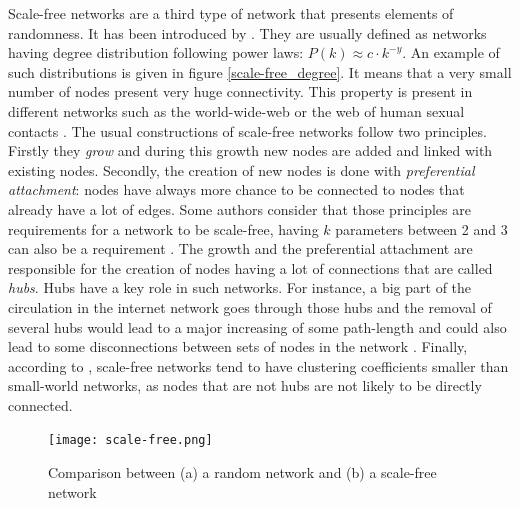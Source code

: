\documentclass[a4paper, 12pt]{report}
\begin{document}
Scale-free networks are a third type of network that presents elements of randomness. It has been introduced by \cite{scale-free}. They are usually defined as networks having degree distribution following power laws: $ P(k) \approx c \cdot k^{-y}$. An example of such distributions is given in figure \ref{scale-free_degree}. It means that a very small number of nodes present very huge connectivity. This property is present in different networks such as the world-wide-web \citep{www} or the web of human sexual contacts \citep{sexual}. The usual constructions of scale-free networks follow two principles. Firstly they \textit{grow} and during this growth new nodes are added and linked with existing nodes. Secondly, the creation of new nodes is done with \textit{preferential attachment}: nodes have always more chance to be connected to nodes that already have a lot of edges. Some authors consider that those principles are requirements for a network to be scale-free, having $k$ parameters between 2 and 3 can also be a requirement \citep{sf_rare}. The growth and the preferential attachment are responsible for the creation of nodes having a lot of connections that are called \textit{hubs}. Hubs have a key role in such networks. For instance, a big part of the circulation in the internet network goes through those hubs and the removal of several hubs would lead to a major increasing of some path-length and could also lead to some disconnections between sets of nodes in the network \citep{general_scale-free}. Finally, according to \cite{SMVSSF}, scale-free networks tend to have clustering coefficients smaller than small-world networks, as nodes that are not hubs are not likely to be directly connected. \citep{general_scale_free2}\\

\begin{figure}
\centering
\texttt{[image: scale-free.png]}
\caption{Comparison between (a) a random network and (b) a scale-free network \citep{complex_networks}}
\label{scale-free_pictures}
\end{figure}
\end{document}
